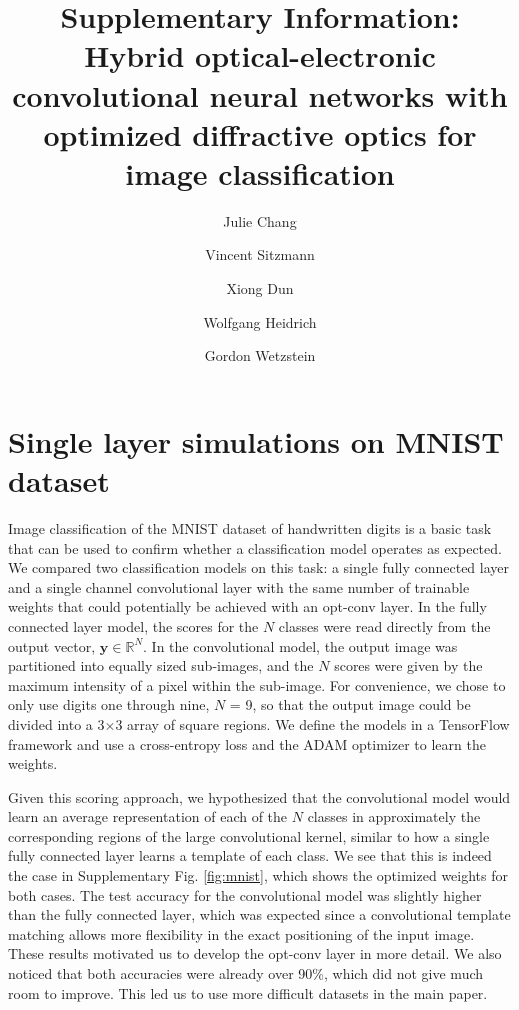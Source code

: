 \documentclass[fleqn,10pt]{wlscirepsupp}
\title{Supplementary Information: \\ Hybrid optical-electronic convolutional neural networks with optimized diffractive optics for image classification}
\author[1,*]{Julie Chang}
\author[2]{Vincent Sitzmann}
\author[3]{Xiong Dun}
\author[3]{Wolfgang Heidrich}
\author[2,*]{Gordon Wetzstein}
\affil[1]{Bioengineering Department, Stanford University, Stanford, CA 94305, USA}
\affil[2]{Electrical Engineering Department, Stanford University, Stanford, CA 94305, USA}
\affil[3]{Visual Computing Center, King Abdullah University of Science and Technology, Thuwal 23955, Saudi Arabia}
\affil[*]{\{jchang10, gordon.wetzstein\}@stanford.edu}
\begin{document}
\flushbottom
\maketitle
%
%
\thispagestyle{empty}



\section{Single layer simulations on MNIST dataset}
Image classification of the MNIST dataset of handwritten digits\cite{mnist} is a basic task that can be used to confirm whether a classification model operates as expected. We compared two classification models on this task: a single fully connected layer and a single channel convolutional layer with the same number of trainable weights that could potentially be achieved with an opt-conv layer. In the fully connected layer model, the scores for the $N$ classes were read directly from the output vector, $\textbf{y} \in \mathbb{R}^{N}$. In the convolutional model, the output image was partitioned into equally sized sub-images, and the $N$ scores were given by the maximum intensity of a pixel within the sub-image. For convenience, we chose to only use digits one through nine, $N$ = 9, so that the output image could be divided into a 3$\times$3 array of square regions. We define the models in a TensorFlow framework and use a cross-entropy loss and the ADAM optimizer to learn the weights. 

Given this scoring approach, we hypothesized that the convolutional model would learn an average representation of each of the $N$ classes in approximately the corresponding regions of the large convolutional kernel, similar to how a single fully connected layer learns a template of each class. We see that this is indeed the case in Supplementary Fig. \ref{fig:mnist}, which shows the optimized weights for both cases. The test accuracy for the convolutional model was slightly higher than the fully connected layer, which was expected since a convolutional template matching allows more flexibility in the exact positioning of the input image. These results motivated us to develop the opt-conv layer in more detail. We also noticed that both accuracies were already over 90\%, which did not give much room to improve. This led us to use more difficult datasets in the main paper. 
\end{document}
